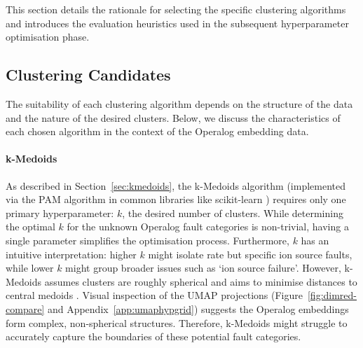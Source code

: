 \documentclass[10pt,oneside]{report}
\begin{document}
This section details the rationale for selecting the specific clustering algorithms and introduces the evaluation heuristics used in the subsequent hyperparameter optimisation phase.

\subsection{Clustering Candidates}

The suitability of each clustering algorithm depends on the structure of the data and the nature of the desired clusters. Below, we discuss the characteristics of each chosen algorithm in the context of the Operalog embedding data.

\paragraph{k-Medoids} As described in Section~\ref{sec:kmedoids}, the k-Medoids algorithm (implemented via the PAM algorithm in common libraries like scikit-learn \cite{scikit-learn}) requires only one primary hyperparameter: $k$, the desired number of clusters. While determining the optimal $k$ for the unknown Operalog fault categories is non-trivial, having a single parameter simplifies the optimisation process. Furthermore, $k$ has an intuitive interpretation:  higher $k$ might isolate rate but specific ion source faults, while lower $k$ might group broader issues such as `ion source failure'. 
However, k-Medoids assumes clusters are roughly spherical and aims to minimise distances to central medoids \cite{kmedoids}. Visual inspection of the UMAP projections (Figure~\ref{fig:dimred-compare} and Appendix~\ref{app:umaphypgrid}) suggests the Operalog embeddings form complex, non-spherical structures. Therefore, k-Medoids might struggle to accurately capture the boundaries of these potential fault categories. 
\end{document}
